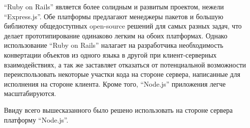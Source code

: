 ``Ruby on Rails'' является более солидным и развитым проектом, нежели
``Express.js''. Обе платформы предлагают менеджеры пакетов и большую библиотеку
общедоступных open-source решений для самых разных задач, что делает
прототипирование одинаково легким на обоих платформах. Однако использование
``Ruby on Rails'' налагает на разработчика необходимость конвертации объектов из
одного языка в другой при клиент-серверных взаимодействиях, а так же заставляет
отказаться от потенциальной возможности переиспользовать некоторые участки кода
на стороне сервера, написанные для исполнения на стороне клиента. Кроме того,
``Node.js'' приложения легче масштабируются.

Ввиду всего вышесказанного было решено использовать  на
стороне сервера платформу ``Node.js''.

